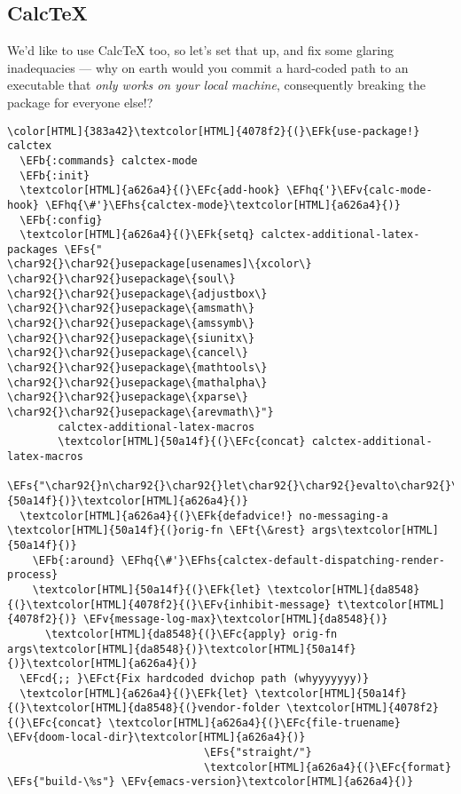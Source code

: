 \documentclass{scrartcl}
\newcommand{\EFk}[1]{\textcolor{EFk}{#1}} %
\newcommand{\EFt}[1]{\textcolor{EFt}{#1}} %
\newcommand{\EFs}[1]{\textcolor{EFs}{#1}} %
\newcommand{\EFb}[1]{\textcolor{EFb}{#1}} %
\newcommand{\EFct}[1]{\textcolor{EFct}{#1}} %
\newcommand{\EFc}[1]{\textcolor{EFc}{#1}} %
\newcommand{\EFv}[1]{\textcolor{EFv}{#1}} %
\newcommand{\EFcd}[1]{\textcolor{EFcd}{#1}} %
\newcommand{\EFhq}[1]{\textcolor{EFhq}{#1}} %
\newcommand{\EFhs}[1]{\textcolor{EFhs}{#1}} %
\begin{document}
\subsection{CalcTeX}
\label{sec:org916018e}
We'd like to use CalcTeX too, so let's set that up, and fix some glaring
inadequacies --- why on earth would you commit a hard-coded path to an executable
that \emph{only works on your local machine}, consequently breaking the package for
everyone else!?

\begin{Code}
\begin{Verbatim}[]
\color[HTML]{383a42}\textcolor[HTML]{4078f2}{(}\EFk{use-package!} calctex
  \EFb{:commands} calctex-mode
  \EFb{:init}
  \textcolor[HTML]{a626a4}{(}\EFc{add-hook} \EFhq{'}\EFv{calc-mode-hook} \EFhq{\#'}\EFhs{calctex-mode}\textcolor[HTML]{a626a4}{)}
  \EFb{:config}
  \textcolor[HTML]{a626a4}{(}\EFk{setq} calctex-additional-latex-packages \EFs{"
\char92{}\char92{}usepackage[usenames]\{xcolor\}
\char92{}\char92{}usepackage\{soul\}
\char92{}\char92{}usepackage\{adjustbox\}
\char92{}\char92{}usepackage\{amsmath\}
\char92{}\char92{}usepackage\{amssymb\}
\char92{}\char92{}usepackage\{siunitx\}
\char92{}\char92{}usepackage\{cancel\}
\char92{}\char92{}usepackage\{mathtools\}
\char92{}\char92{}usepackage\{mathalpha\}
\char92{}\char92{}usepackage\{xparse\}
\char92{}\char92{}usepackage\{arevmath\}"}
        calctex-additional-latex-macros
        \textcolor[HTML]{50a14f}{(}\EFc{concat} calctex-additional-latex-macros
                \EFs{"\char92{}n\char92{}\char92{}let\char92{}\char92{}evalto\char92{}\char92{}Rightarrow"}\textcolor[HTML]{50a14f}{)}\textcolor[HTML]{a626a4}{)}
  \textcolor[HTML]{a626a4}{(}\EFk{defadvice!} no-messaging-a \textcolor[HTML]{50a14f}{(}orig-fn \EFt{\&rest} args\textcolor[HTML]{50a14f}{)}
    \EFb{:around} \EFhq{\#'}\EFhs{calctex-default-dispatching-render-process}
    \textcolor[HTML]{50a14f}{(}\EFk{let} \textcolor[HTML]{da8548}{(}\textcolor[HTML]{4078f2}{(}\EFv{inhibit-message} t\textcolor[HTML]{4078f2}{)} \EFv{message-log-max}\textcolor[HTML]{da8548}{)}
      \textcolor[HTML]{da8548}{(}\EFc{apply} orig-fn args\textcolor[HTML]{da8548}{)}\textcolor[HTML]{50a14f}{)}\textcolor[HTML]{a626a4}{)}
  \EFcd{;; }\EFct{Fix hardcoded dvichop path (whyyyyyyy)}
  \textcolor[HTML]{a626a4}{(}\EFk{let} \textcolor[HTML]{50a14f}{(}\textcolor[HTML]{da8548}{(}vendor-folder \textcolor[HTML]{4078f2}{(}\EFc{concat} \textcolor[HTML]{a626a4}{(}\EFc{file-truename} \EFv{doom-local-dir}\textcolor[HTML]{a626a4}{)}
                               \EFs{"straight/"}
                               \textcolor[HTML]{a626a4}{(}\EFc{format} \EFs{"build-\%s"} \EFv{emacs-version}\textcolor[HTML]{a626a4}{)}

\end{Verbatim}
\end{Code}
\end{document}
